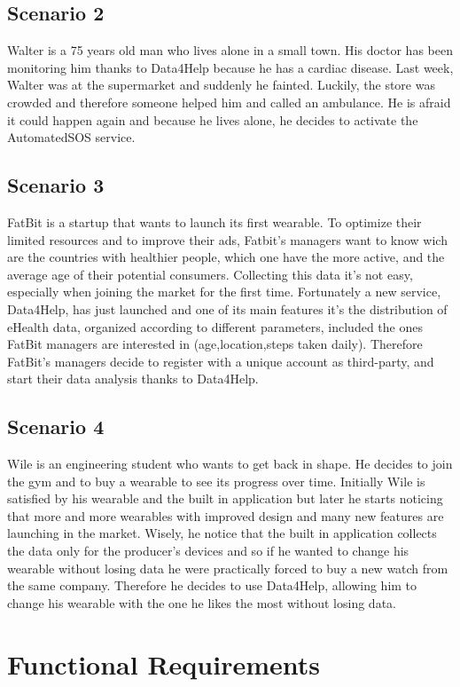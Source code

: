 \subsection{Scenario 2}
Walter is a 75 years old man who lives alone in a small town.
His doctor has been monitoring him thanks to Data4Help because he has a cardiac disease.
Last week, Walter was at the supermarket and suddenly he fainted. Luckily, the store was crowded and therefore someone helped him and called an ambulance.
He is afraid it could happen again and because he lives alone, he decides to activate the AutomatedSOS service.


\subsection{Scenario 3}
FatBit is a startup that wants to launch its first wearable. To optimize their limited resources and to improve their ads, Fatbit's managers want to know wich are the countries with healthier people, which one have the more active, and the average age of their potential consumers. Collecting this data it's not easy, especially when joining the market for the first time. Fortunately a new service, Data4Help, has just launched and one of its main features it's the distribution of eHealth data, organized according to different parameters, included the ones FatBit managers are interested in (age,location,steps taken daily).
Therefore FatBit's managers decide to register with a unique account as third-party, and start their data analysis thanks to Data4Help.


\subsection{Scenario 4}
Wile is an engineering student who wants to get back in shape. He decides to join the gym and to buy a wearable to see its progress over time. Initially Wile is satisfied by his wearable and the built in application but later he starts noticing that more and more wearables with improved design and many new features are launching in the market. Wisely, he notice that the built in application collects the data only for the producer's devices and so if he wanted to change his wearable without losing data he were practically forced to buy a new watch from the same company. Therefore he decides to use Data4Help, allowing him to change his wearable with the one he likes the most without losing data.

\section{Functional Requirements}

